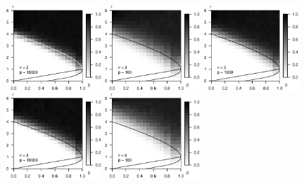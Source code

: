 \begin{figure}
      \includegraphics[width=0.32\textwidth]{sim_strong_boundary/simulated_phase_diagram_chi-squared_nu2_p10000.eps}
      \includegraphics[width=0.32\textwidth]{sim_strong_boundary/simulated_phase_diagram_chi-squared_nu3_p100.eps}
      \includegraphics[width=0.32\textwidth]{sim_strong_boundary/simulated_phase_diagram_chi-squared_nu3_p1000.eps}
      \includegraphics[width=0.32\textwidth]{sim_strong_boundary/simulated_phase_diagram_chi-squared_nu3_p10000.eps}
      \includegraphics[width=0.32\textwidth]{sim_strong_boundary/simulated_phase_diagram_chi-squared_nu6_p100.eps}

\end{figure}
